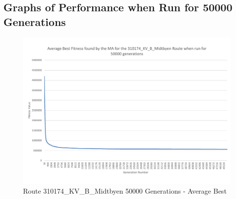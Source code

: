 


\subsection{Graphs of Performance when Run for 50000 Generations} %
\label{sub:graphs_of_performance_when_run_for_50000_generations_KV_B}

\begin{landscape}
\begin{figure}[thbp]
	\centerline{\includegraphics[height=0.945\textwidth]{figures/Trondheim_graphs/KV_B/KV_B-all_average_best.pdf}}
	\caption{Route 310174\_KV\_B\_Midtbyen 50000 Generations - Average Best}
	\label{fig:KV_B_50k_ab}
\end{figure}
\end{landscape}

